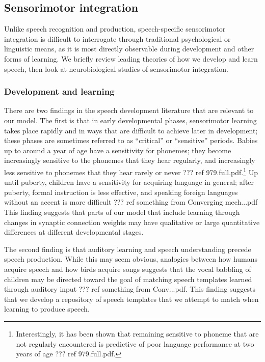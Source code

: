 
\subsection{Sensorimotor integration}

Unlike speech recognition and production,
speech-specific sensorimotor integration
is difficult to interrogate through
traditional psychological or linguistic means,
as it is most directly observable
during development and other forms of learning.
We briefly review leading theories
of how we develop and learn speech,
then look at neurobiological studies
of sensorimotor integration.

\subsubsection{Development and learning}

There are two findings in the
speech development literature
that are relevant to our model.
The first is that in
early developmental phases,
sensorimotor learning
takes place rapidly
and in ways that are difficult
to achieve later in development;
these phases are sometimes referred
to as ``critical'' or ``sensitive'' periods.
Babies up to around a year of age
have a sensitivity for phonemes;
they become increasingly sensitive
to the phonemes that they hear regularly,
and increasingly less sensitive
to phonemes that they hear rarely or never
??? ref 979.full.pdf.\footnote{
  Interestingly, it has been shown that
  remaining sensitive to phoneme
  that are not regularly encountered
  is predictive of poor language performance
  at two years of age ??? ref 979.full.pdf.}
Up until puberty,
children have a sensitivity for
acquiring language in general;
after puberty, formal instruction
is less effective,
and speaking foreign languages
without an accent is more difficult
??? ref something from Converging mech...pdf
This finding suggests that
parts of our model
that include learning
through changes in synaptic connection weights
may have qualitative or large quantitative
differences at different developmental stages.

The second finding is that
auditory learning
and speech understanding precede
speech production.
While this may seem obvious,
analogies between how humans acquire speech
and how birds acquire songs suggests that
the vocal babbling of children
may be directed toward the goal of
matching speech templates learned
through auditory input
??? ref something from Conv...pdf.
This finding suggests that
we develop a repository of speech templates
that we attempt to match when
learning to produce speech.

